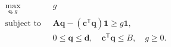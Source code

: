 \par\needspace{70pt}\begin{minipage}{\linewidth}
\begin{equation}\begin{aligned}\max_{\mathbf q,g}\;&g\\ \text{subject to }\;&\mathbf A\mathbf q-(\mathbf c^{\mathsf T}\mathbf q)\mathbf1\geq g\mathbf1,\\&0\leq\mathbf q\leq\mathbf d,\quad\mathbf c^{\mathsf T}\mathbf q\leq B,\quad g\geq0.\end{aligned}\label{eq:11}\end{equation}
\end{minipage}\par
